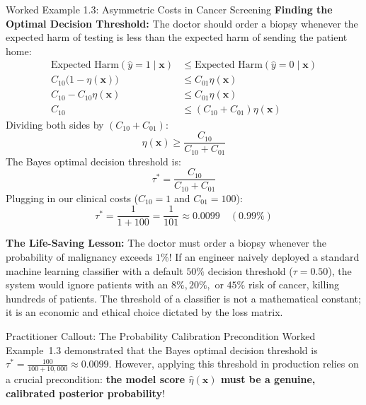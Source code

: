 \begin{examplebox}{Worked Example 1.3: Asymmetric Costs in Cancer Screening}
\textbf{Finding the Optimal Decision Threshold:}
The doctor should order a biopsy whenever the expected harm of testing is less than the expected harm of sending the patient home:
\begin{align*}
\text{Expected Harm}(\hat{y} = 1 \mid \mathbf{x}) &\le \text{Expected Harm}(\hat{y} = 0 \mid \mathbf{x}) \\
C_{10} \big(1 - \eta(\mathbf{x})\big) &\le C_{01} \eta(\mathbf{x}) \\
C_{10} - C_{10} \eta(\mathbf{x}) &\le C_{01} \eta(\mathbf{x}) \\
C_{10} &\le (C_{10} + C_{01}) \eta(\mathbf{x})
\end{align*}
Dividing both sides by $(C_{10} + C_{01})$:
\begin{equation*}
\eta(\mathbf{x}) \ge \frac{C_{10}}{C_{10} + C_{01}}
\end{equation*}
The Bayes optimal decision threshold is:
\begin{equation}
\tau^* = \frac{C_{10}}{C_{10} + C_{01}}
\label{eq:asymmetric_bayes_threshold}
\end{equation}
Plugging in our clinical costs ($C_{10} = 1$ and $C_{01} = 100$):
\begin{equation*}
\tau^* = \frac{1}{1 + 100} = \frac{1}{101} \approx \mathbf{0.0099} \quad (\mathbf{0.99\%})
\end{equation*}

\textbf{The Life-Saving Lesson:}
The doctor must order a biopsy whenever the probability of malignancy exceeds \textbf{$1\%$}! 
If an engineer naively deployed a standard machine learning classifier with a default $50\%$ decision threshold ($\tau = 0.50$), the system would ignore patients with an $8\%, 20\%,$ or $45\%$ risk of cancer, killing hundreds of patients. The threshold of a classifier is not a mathematical constant; it is an economic and ethical choice dictated by the loss matrix.


\begin{intuitionbox}{Practitioner Callout: The Probability Calibration Precondition}
Worked Example~1.3 demonstrated that the Bayes optimal decision threshold is $\tau^* = \frac{100}{100 + 10{,}000} \approx 0.0099$. However, applying this threshold in production relies on a crucial precondition: \textbf{the model score $\hat{\eta}(\mathbf{x})$ must be a genuine, calibrated posterior probability}!


\end{intuitionbox}
\end{examplebox}
